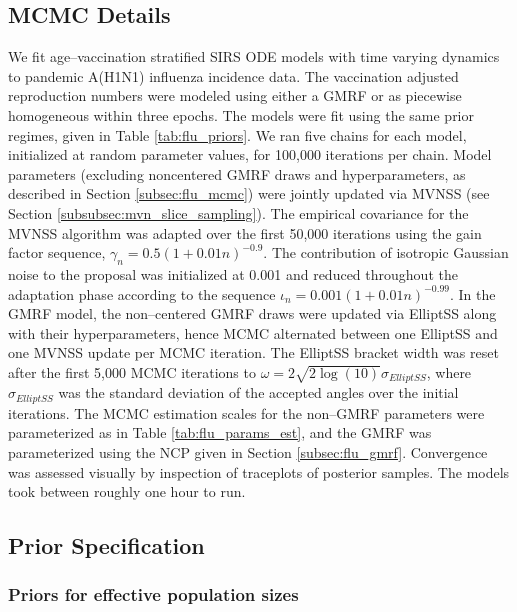 \subsection{MCMC Details}
\label{subsec:flu_mcmc_details}
We fit age--vaccination stratified SIRS ODE models with time varying dynamics to pandemic A(H1N1) influenza incidence data. The vaccination adjusted reproduction numbers were modeled using either a GMRF or as piecewise homogeneous within three epochs. The models were fit using the same prior regimes, given in Table \ref{tab:flu_priors}. We ran five chains for each model, initialized at random parameter values, for 100,000 iterations per chain. Model parameters (excluding noncentered GMRF draws and hyperparameters, as described in Section \ref{subsec:flu_mcmc}) were jointly updated via MVNSS (see Section \ref{subsubsec:mvn_slice_sampling}). The empirical covariance for the MVNSS algorithm was adapted over the first 50,000 iterations using the gain factor sequence, $\gamma_n = 0.5(1 + 0.01n)^{-0.9}$. The contribution of isotropic Gaussian noise to the proposal was initialized at 0.001 and reduced throughout the adaptation phase according to the sequence $ \iota_n = 0.001(1 + 0.01n)^{-0.99} $. In the GMRF model, the non--centered GMRF draws were updated via ElliptSS along with their hyperparameters, hence MCMC alternated between one ElliptSS and one MVNSS update per MCMC iteration. The ElliptSS bracket width was reset after the first 5,000 MCMC iterations to $ \omega = 2\sqrt{2\log(10)}\sigma_{ElliptSS}$, where $ \sigma_{ElliptSS} $ was the standard deviation of the accepted angles over the initial iterations. The MCMC estimation scales for the non--GMRF parameters were parameterized as in Table \ref{tab:flu_params_est}, and the GMRF was parameterized using the NCP given in Section \ref{subsec:flu_gmrf}. Convergence was assessed visually by inspection of traceplots of posterior samples. The models took between roughly one hour to run.

\newpage
\subsection{Prior Specification}
\label{subsec:flu_priors}

\subsubsection{Priors for effective population sizes}
\label{subsubsec:flu_effpop_priors}

